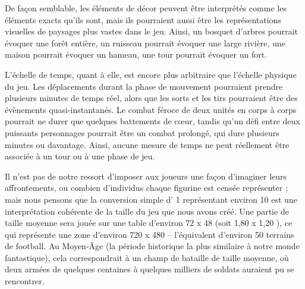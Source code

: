 De façon semblable, les éléments de décor peuvent être interprétés comme les éléments exacts qu’ils sont, mais ils pourraient aussi être les représentations visuelles de paysages plus vastes dans le jeu. Ainsi, un bosquet d’arbres pourrait évoquer une forêt entière, un ruisseau pourrait évoquer une large rivière, une maison pourrait évoquer un hameau, une tour pourrait évoquer un fort.

L’échelle de temps, quant à elle, est encore plus arbitraire que l’échelle physique du jeu. Les déplacements durant la phase de mouvement pourraient prendre plusieurs minutes de temps réel, alors que les sorts et les tirs pourraient être des évènements quasi-instantanés. Le combat féroce de deux unités en corps à corps pourrait ne durer que quelques battements de cœur, tandis qu’un défi entre deux puissants personnages pourrait être un combat prolongé, qui dure plusieurs minutes ou davantage. Ainsi, aucune mesure de temps ne peut réellement être associée à un tour ou à une phase de jeu.

Il n’est pas de notre ressort d’imposer aux joueurs une façon d’imaginer leurs affrontements, ou combien d’individus chaque figurine est censée représenter ; mais nous pensons que la conversion simple d’ 1\pouce{} représentant environ 10 \meter{} est une interprétation cohérente de la taille du jeu que nous avons créé. Une partie de taille moyenne sera jouée sur une table d’environ 72\pouce{} x 48\pouce{} (soit 1,80 \meter{} x 1,20 \meter{}), ce qui représente une zone d’environ 720 \meter{} x 480 \meter{} – l’équivalent d’environ 50 terrains de football. Au Moyen-Âge (la période historique la plus similaire à notre monde fantastique), cela correspondrait à un champ de bataille de taille moyenne, où deux armées de quelques centaines à quelques milliers de soldats auraient pu se rencontrer.
